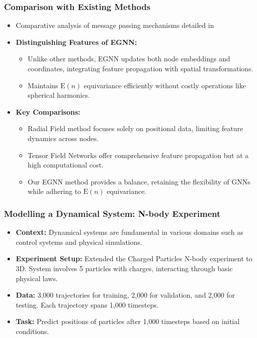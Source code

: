 \documentclass[11pt,xcolor={dvipsnames},hyperref={pdftex,pdfpagemode=UseNone,hidelinks,pdfdisplaydoctitle=true},usepdftitle=false]{beamer}
\newcommand{\En}{\mathrm{E}(n)}
\begin{document}
\begin{frame}
\frametitle{Comparison with Existing Methods}
\begin{itemize}
    \item Comparative analysis of message passing mechanisms detailed in 
    \item \textbf{Distinguishing Features of EGNN:}
    \begin{itemize}
    \item Unlike other methods, EGNN updates both node embeddings and coordinates, integrating feature propagation with spatial transformations.
    \item Maintains $\En$ equivariance efficiently without costly operations like spherical harmonics.
    \end{itemize}
    \item \textbf{Key Comparisons:}
    \begin{itemize}
    \item Radial Field method focuses solely on positional data, limiting feature dynamics across nodes.
    \item Tensor Field Networks offer comprehensive feature propagation but at a high computational cost.
    \item Our EGNN method provides a balance, retaining the flexibility of GNNs while adhering to $\En$ equivariance.
    \end{itemize}
\end{itemize}
\end{frame}

\begin{frame}
\frametitle{Modelling a Dynamical System: N-body Experiment}
\begin{itemize}
    \item \textbf{Context:} Dynamical systems are fundamental in various domains such as control systems and physical simulations.
    \item \textbf{Experiment Setup:} Extended the Charged Particles N-body experiment to 3D. System involves 5 particles with charges, interacting through basic physical laws.
    \item \textbf{Data:} 3,000 trajectories for training, 2,000 for validation, and 2,000 for testing. Each trajectory spans 1,000 timesteps.
    \item \textbf{Task:} Predict positions of particles after 1,000 timesteps based on initial conditions.
\end{itemize}
\end{frame}    
\end{document}
